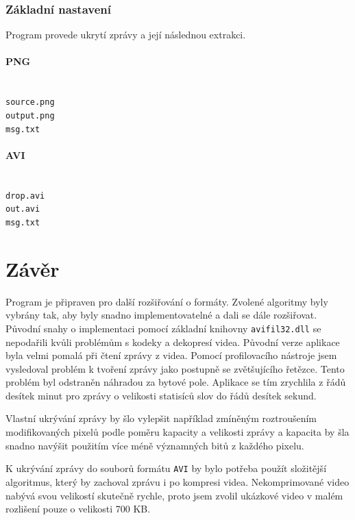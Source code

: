 \documentclass[12pt]{article}
\begin{document}
\subsubsection{Základní nastavení}
\label{default_settings}
Program provede ukrytí zprávy a její následnou extrakci.

\paragraph{PNG}\mbox{}\\
 \texttt{source.png}\\
 \texttt{output.png}\\
 \texttt{msg.txt}

\paragraph{AVI}\mbox{}\\
 \texttt{drop.avi}\\
 \texttt{out.avi}\\
 \texttt{msg.txt}

\pagebreak
\section{Závěr}
Program je připraven pro další rozšiřování o formáty. Zvolené algoritmy byly vybrány tak, aby byly snadno implementovatelné a dali se dále rozšiřovat. Původní snahy o implementaci pomocí základní knihovny \texttt{avifil32.dll} se nepodařili kvůli problémům s kodeky a dekopresí videa. Původní verze aplikace byla velmi pomalá při čtení zprávy z videa. Pomocí profilovacího nástroje jsem vysledoval problém k  tvoření zprávy jako postupně se zvětšujícího řetězce. Tento problém byl odstraněn náhradou za bytové pole. Aplikace se tím zrychlila z řádů desítek minut pro zprávy o velikosti statisíců slov do řádů desítek sekund.

Vlastní ukrývání zprávy by šlo vylepšit například zmíněným roztroušením modifikovaných pixelů podle poměru kapacity a velikosti zprávy a kapacita by šla snadno navýšit použitím více méně významných bitů z každého pixelu.

K ukrývání zprávy do souborů formátu \texttt{AVI} by bylo potřeba použít složitější algoritmus, který by zachoval zprávu i po kompresi videa. Nekomprimované video nabývá svou velikostí skutečně rychle, proto jsem zvolil ukázkové video v malém rozlišení pouze o velikosti 700 KB.
\end{document}
